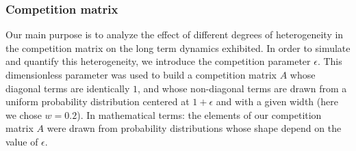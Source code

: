 \begin{table}[H]
	\begin{center}
	\end{center}
	\caption{Values and meanings of the parameters used in our numerical experiment}
	\label{tab:Parameters}
\end{table}

\subsubsection{Competition matrix}
\label{subsubsec:CompetitionParameter}

Our main purpose is to analyze the effect of different degrees of heterogeneity in the competition matrix on the long term dynamics exhibited. In order to simulate and quantify this heterogeneity, we introduce the competition parameter $ \epsilon $. This dimensionless parameter was used to build a competition matrix $A$ whose diagonal terms are identically $ 1 $, and whose non-diagonal terms are drawn from a uniform probability distribution centered at $ 1 + \epsilon $ and with a given width (here we chose $ w = 0.2$). In mathematical terms: the elements of our competition matrix $A$ were drawn from probability distributions whose shape depend on the value of $\epsilon$.

